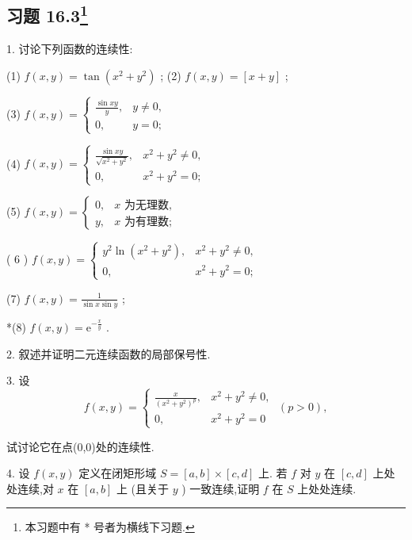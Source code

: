 \subsection{习题 16.3\footnote{本习题中有 * 号者为横线下习题.}}

1. 讨论下列函数的连续性:

(1) \(f\left( {x,y}\right)  = \tan \left( {{x}^{2} + {y}^{2}}\right)\) ;
(2) \(f\left( {x,y}\right)  = \left\lbrack  {x + y}\right\rbrack\) ;

(3) \(f\left( {x,y}\right)  = \left\{  \begin{array}{ll} \frac{\sin {xy}}{y}, & y \neq  0, \\  0, & y = 0; \end{array}\right.\)

 (4) \(f\left( {x,y}\right)  = \left\{  \begin{matrix} \frac{\sin {xy}}{\sqrt{{x}^{2} + {y}^{2}}}, & {x}^{2} + {y}^{2} \neq  0, \\  0, & {x}^{2} + {y}^{2} = 0; \end{matrix}\right.\)

(5) \(f\left( {x,y}\right)  = \left\{  \begin{array}{ll} 0, & x\text{ 为无理数, } \\  y, & x\text{ 为有理数; } \end{array}\right.\)

( 6 ) \(f\left( {x,y}\right)  = \left\{  \begin{matrix} {y}^{2}\ln \left( {{x}^{2} + {y}^{2}}\right) , & {x}^{2} + {y}^{2} \neq  0, \\  0, & {x}^{2} + {y}^{2} = 0; \end{matrix}\right.\)

(7) \(f\left( {x,y}\right)  = \frac{1}{\sin x\sin y}\) ;

*(8) \(f\left( {x,y}\right)  = {\mathrm{e}}^{-\frac{x}{y}}\) .

2. 叙述并证明二元连续函数的局部保号性.

3. 设
\[
f\left( {x,y}\right)  = \left\{  {\begin{matrix} \frac{x}{{\left( {x}^{2} + {y}^{2}\right) }^{p}}, & {x}^{2} + {y}^{2} \neq  0, \\  0, & {x}^{2} + {y}^{2} = 0 \end{matrix}\;\left( {p > 0}\right) ,}\right.
\]


试讨论它在点(0,0)处的连续性.

4. 设 \(f\left( {x,y}\right)\) 定义在闭矩形域 \(S = \left\lbrack  {a,b}\right\rbrack   \times  \left\lbrack  {c,d}\right\rbrack\) 上. 若 \(f\) 对 \(y\) 在 \(\left\lbrack  {c,d}\right\rbrack\) 上处处连续,对 \(x\) 在 \(\left\lbrack  {a,b}\right\rbrack\) 上 (且关于 \(y\) ) 一致连续,证明 \(f\) 在 \(S\) 上处处连续.

